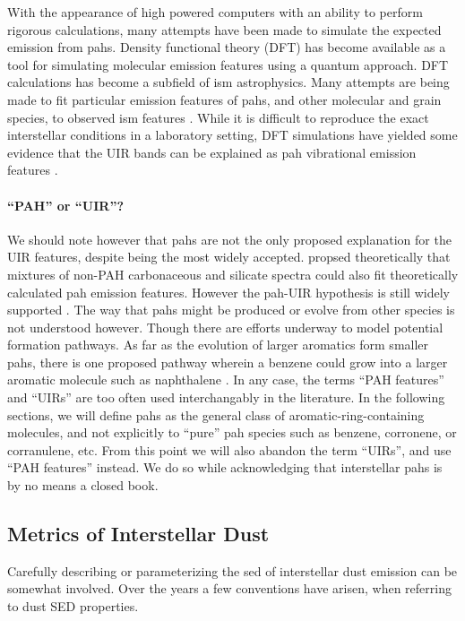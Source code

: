      With the appearance of high powered computers with an ability to perform rigorous calculations, many attempts have been made to simulate the expected emission from \gls{pah}s. Density functional theory (DFT) \citep{honenberg64} has become available as a tool for simulating molecular emission features using a quantum approach. DFT calculations has become a subfield of \gls{ism} astrophysics. Many attempts are being made to fit particular emission features of \gls{pah}s, and other molecular and grain species, to observed \gls{ism} features \citep{hammonds09,hirata99}.
     While it is difficult to reproduce the exact interstellar conditions in a laboratory setting, DFT simulations have yielded some evidence that the UIR bands can be explained as \gls{pah} vibrational emission features \citep{pathak12,ricca11,yu12}.

    \paragraph{``PAH'' or ``UIR''?}
      We should note however that \gls{pah}s are not the only proposed explanation for the UIR features, despite being the most widely accepted. \cite{zhang14} propsed theoretically that mixtures of non-PAH carbonaceous and silicate spectra could also fit theoretically calculated \gls{pah} emission features. However the \gls{pah}-UIR hypothesis is still widely supported \citep{tielens08,rastogi13}.  The way that \gls{pah}s might be produced or evolve from other species is not understood however. Though there are efforts underway to model potential formation pathways. As far as the evolution of larger aromatics form smaller \gls{pah}s, there is one proposed pathway wherein a benzene could grow into a larger aromatic molecule such as naphthalene \citep{ghesquiere14}. In any case, the terms ``PAH features'' and ``UIRs'' are too often used interchangably in the literature. In the following sections, we will define \gls{pah}s as the general class of aromatic-ring-containing molecules, and not explicitly to ``pure'' \gls{pah} species such as benzene, corronene, or corranulene, etc. From this point we will also abandon the term ``UIRs'', and use ``PAH features'' instead. We do so while acknowledging that interstellar \gls{pah}s is by no means a closed book.



     \subsection{Metrics of Interstellar Dust}
      Carefully describing or parameterizing the \gls{sed} of interstellar dust emission can be somewhat involved. Over the years a few conventions have arisen, when referring to dust SED properties.

